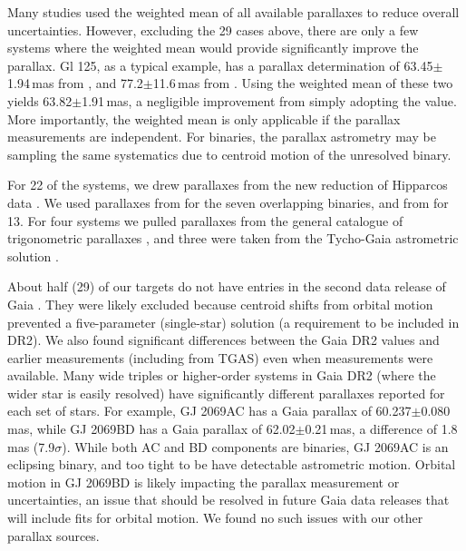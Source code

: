 \documentclass[twocolumn]{aastex62}
\begin{document}
Many studies used the weighted mean of all available parallaxes \citep[e.g.,][]{Winters2015} to reduce overall uncertainties. However, excluding the 29 cases above, there are only a few systems where the weighted mean would provide significantly improve the parallax. Gl 125, as a typical example, has a parallax determination of 63.45$\pm$1.94\,mas from \citet{van-Leeuwen:2007yq}, and 77.2$\pm$11.6\,mas from \citet{van-Altena1995}. Using the weighted mean of these two yields 63.82$\pm$1.91\,mas, a negligible improvement from simply adopting the \citet{van-Leeuwen:2007yq} value. More importantly, the weighted mean is only applicable if the parallax measurements are independent. For binaries, the parallax astrometry may be sampling the same systematics due to centroid motion of the unresolved binary. 

For 22 of the systems, we drew parallaxes from the new reduction of Hipparcos data \citep{van-Leeuwen:2007yq}. We used parallaxes from \citet{Dupuy2017} for the seven overlapping binaries, and from \citet{Benedict2016} for 13. For four systems we pulled parallaxes from the general catalogue of trigonometric parallaxes \citep{van-Altena1995}, and three were taken from the Tycho-Gaia astrometric solution \citep[TGAS or Gaia DR1,][]{gaiadr1}.

About half (29) of our targets do not have entries in the second data release of Gaia \citep[DR2, ][]{GaiaDr2,Gaia-Collaboration:2018aa}. They were likely excluded because centroid shifts from orbital motion prevented a five-parameter (single-star) solution (a requirement to be included in DR2). We also found significant differences between the Gaia DR2 values and earlier measurements (including from TGAS) even when measurements were available. Many wide triples or higher-order systems in Gaia DR2 (where the wider star is easily resolved) have significantly different parallaxes reported for each set of stars. For example, GJ 2069AC has a Gaia parallax of 60.237$\pm$0.080\,mas, while GJ 2069BD has a Gaia parallax of 62.02$\pm$0.21\,mas, a difference of 1.8\,mas (7.9$\sigma$). While both AC and BD components are binaries, GJ 2069AC is an eclipsing binary, and too tight to be have detectable astrometric motion. Orbital motion in GJ 2069BD is likely impacting the parallax measurement or uncertainties, an issue that should be resolved in future Gaia data releases that will include fits for orbital motion. We found no such issues with our other parallax sources.
\end{document}
